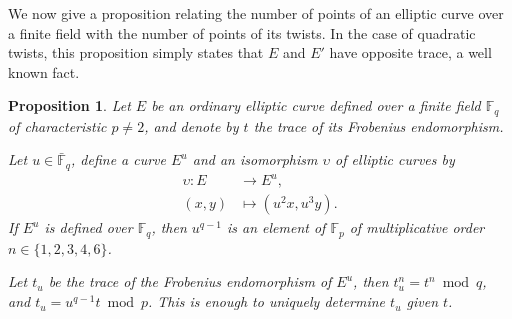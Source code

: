 \documentclass[12pt]{article}
\theoremstyle{plain}
\newtheorem{proposition}[theorem]{Proposition}
\theoremstyle{definition}
\def\F{\ensuremath{\mathbb{F}}}
\begin{document}
We now give a proposition relating the number of points of an elliptic
curve over a finite field with the number of points of its twists.  In
the case of quadratic twists, this proposition simply states that $E$
and $E'$ have opposite trace, a well known fact.

\begin{proposition}
  \label{proposition:twisttrace}
  Let $E$ be an ordinary elliptic curve defined over a finite field
  $\F_q$ of characteristic $p\ne2$, and denote by $t$ the trace of its
  Frobenius endomorphism.

  Let $u\in\bar{\F}_q$, define a curve $E^u$ and an isomorphism
  $\upsilon$ of elliptic curves by
  \begin{equation*}
    \begin{aligned}
      \upsilon : E &\to E^u,\\
      (x,y) &\mapsto (u^2x,u^3y).
    \end{aligned}
  \end{equation*}
  If $E^u$ is defined over $\F_q$, then $u^{q-1}$ is an element of
  $\F_p$ of multiplicative order $n\in\{1,2,3,4,6\}$.

  Let $t_u$ be the trace of the Frobenius endomorphism of $E^u$, then
  $t_u^n=t^n \bmod q$, and $t_u=u^{q-1}t\bmod p$. This is enough to
  uniquely determine $t_u$ given $t$.
\end{proposition}
\end{document}
